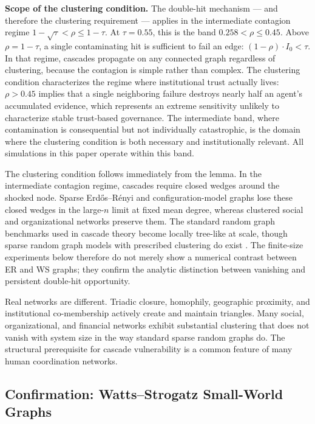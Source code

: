 \documentclass[11pt,a4paper]{article}
\begin{document}
\textbf{Scope of the clustering condition.} The double-hit mechanism --- and therefore the clustering requirement --- applies in the intermediate contagion regime $1 - \sqrt{\tau} < \rho \leq 1 - \tau$. At $\tau = 0.55$, this is the band $0.258 < \rho \leq 0.45$. Above $\rho = 1 - \tau$, a single contaminating hit is sufficient to fail an edge: $(1-\rho) \cdot I_0 < \tau$. In that regime, cascades propagate on any connected graph regardless of clustering, because the contagion is simple rather than complex. The clustering condition characterizes the regime where institutional trust actually lives: $\rho > 0.45$ implies that a single neighboring failure destroys nearly half an agent's accumulated evidence, which represents an extreme sensitivity unlikely to characterize stable trust-based governance. The intermediate band, where contamination is consequential but not individually catastrophic, is the domain where the clustering condition is both necessary and institutionally relevant. All simulations in this paper operate within this band.

The clustering condition follows immediately from the lemma. In the intermediate contagion regime, cascades require closed wedges around the shocked node. Sparse Erd\H{o}s--R\'enyi and configuration-model graphs lose these closed wedges in the large-$n$ limit at fixed mean degree, whereas clustered social and organizational networks preserve them. The standard random graph benchmarks used in cascade theory become locally tree-like at scale, though sparse random graph models with prescribed clustering do exist \cite{newman2009}. The finite-size experiments below therefore do not merely show a numerical contrast between ER and WS graphs; they confirm the analytic distinction between vanishing and persistent double-hit opportunity.

Real networks are different. Triadic closure, homophily, geographic proximity, and institutional co-membership actively create and maintain triangles. Many social, organizational, and financial networks exhibit substantial clustering that does not vanish with system size in the way standard sparse random graphs do. The structural prerequisite for cascade vulnerability is a common feature of many human coordination networks.

\subsection{Confirmation: Watts--Strogatz Small-World Graphs}
\end{document}
